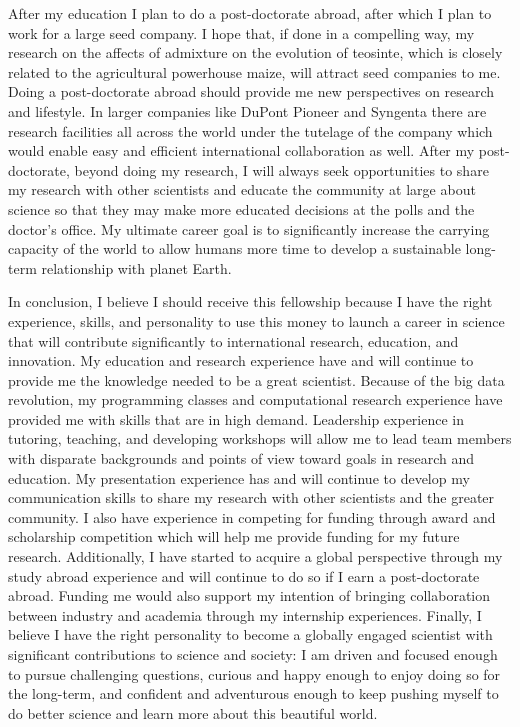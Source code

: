 \documentclass[12pt]{amsart}
\begin{document}
After my education I plan to do a post-doctorate abroad, after which I plan to work for a large seed company.
I hope that, if done in a compelling way, my research on the affects of admixture on the evolution of teosinte, which is closely related to the agricultural powerhouse maize, will attract seed companies to me.
Doing a post-doctorate abroad should provide me new perspectives on research and lifestyle.
In larger companies like DuPont Pioneer and Syngenta there are research facilities all across the world under the tutelage of the company which would enable easy and efficient international collaboration as well.
After my post-doctorate, beyond doing my research, I will always seek opportunities to share my research with other scientists and educate the community at large about science so that they may make more educated decisions at the polls and the doctor's office.
My ultimate career goal is to significantly increase the carrying capacity of the world to allow humans more time to develop a sustainable long-term relationship with planet Earth.

In conclusion, I believe I should receive this fellowship because I have the right experience, skills, and personality to use this money to launch a career in science that will contribute significantly to international research, education, and innovation.  
My education and research experience have and will continue to provide me the knowledge needed to be a great scientist.  
Because of the big data revolution, my programming classes and computational research experience have provided me with skills that are in high demand.
Leadership experience in tutoring, teaching, and developing workshops will allow me to lead team members with disparate backgrounds and points of view toward goals in research and education.
My presentation experience has and will continue to develop my communication skills to share my research with other scientists and the greater community.
I also have experience in competing for funding through award and scholarship competition which will help me provide funding for my future research.  
Additionally, I have started to acquire a global perspective through my study abroad experience and will continue to do so if I earn a post-doctorate abroad.  
Funding me would also support my intention of bringing collaboration between industry and academia through my internship experiences.
Finally, I believe I have the right personality to become a globally engaged scientist with significant contributions to science and society: I am driven and focused enough to pursue challenging questions, curious and happy enough to enjoy doing so for the long-term, and confident and adventurous enough to keep pushing myself to do better science and learn more about this beautiful world.
\end{document}

